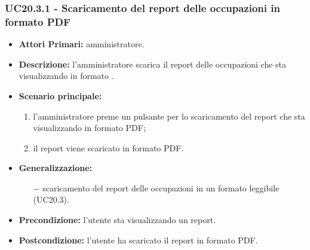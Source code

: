 \subsubsection{ UC20.3.1 - Scaricamento del report delle occupazioni in formato PDF}
\begin{itemize}
	\item\textbf{Attori Primari:} 
	amministratore.
	\item\textbf{Descrizione:} 
	l'amministratore scarica il report delle occupazioni che sta visualizzando in formato .
	\item\textbf{Scenario principale:} 
	\begin{enumerate}
		\item l'amministratore preme un pulsante per lo scaricamento del report che sta visualizzando in formato PDF;
		\item il report viene scaricato in formato PDF.
	\end{enumerate}
	\item\textbf{Generalizzazione:}
	\begin{itemize}
		\item[$-$] scaricamento del report delle occupazioni in un formato leggibile (UC20.3).
	\end{itemize}
	\item\textbf{Precondizione:} 
	l'utente sta visualizzando un report.
	\item\textbf{Postcondizione:}
	l'utente ha scaricato il report in formato PDF.
\end{itemize}


